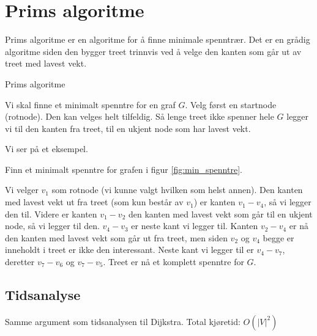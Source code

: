 \section{Prims algoritme}
\label{prim}

Prims algoritme er en algoritme for å finne minimale spenntrær. Det er en grådig algoritme siden den bygger treet trinnvis ved å velge den kanten som går ut av treet med lavest vekt. 

\begin{theorem} Prims algoritme

Vi skal finne et minimalt spenntre for en graf $ G $. Velg først en startnode (rotnode). Den kan velges helt tilfeldig. Så lenge treet ikke spenner hele $ G $ legger vi til den kanten fra treet, til en ukjent node som har lavest vekt.
\end{theorem}
\noindent Vi ser på et eksempel.
\begin{example} Finn et minimalt spenntre for grafen i figur \ref{fig:min_spenntre}.

Vi velger $ v_1 $ som rotnode (vi kunne valgt hvilken som helst annen). Den kanten med lavest vekt ut fra treet (som kun består av $ v_1 $) er kanten $ v_1-v_4 $, så vi legger den til. Videre er kanten $ v_1-v_2 $ den kanten med lavest vekt som går til en ukjent node, så vi legger til den. $ v_4-v_3 $ er neste kant vi legger til. Kanten $ v_2-v_4 $ er nå den kanten med lavest vekt som går ut fra treet, men siden $ v_2 $ og $ v_4 $ begge er inneholdt i treet er ikke den interessant. Neste kant vi legger til er $ v_4-v_7 $, deretter $ v_7-v_6 $ og $ v_7-v_5 $. Treet er nå et komplett spenntre for $ G $. 
\end{example}

\subsection{Tidsanalyse}
Samme argument som tidsanalysen til Dijkstra. Total kjøretid: $ O\left(|V|^2\right) $
